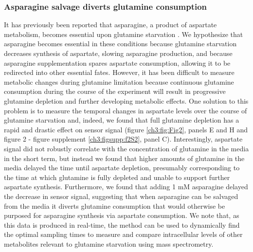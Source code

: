 \subsubsection{Asparagine salvage diverts glutamine consumption}
It has previously been reported that asparagine, a product of aspartate metabolism, becomes essential upon glutamine starvation \cite{Pavlova2018-nl, Zhang2014-zz}.
We hypothesize that asparagine becomes essential in these conditions because glutamine starvation decreases synthesis of aspartate, slowing asparagine production, and because asparagine supplementation spares aspartate consumption, allowing it to be redirected into other essential fates.
However, it has been difficult to measure metabolic changes during glutamine limitation because continuous glutamine consumption during the course of the experiment will result in progressive glutamine depletion and further developing metabolic effects.
One solution to this problem is to measure the temporal changes in aspartate levels over the course of glutamine starvation and, indeed, we found that full glutamine depletion has a rapid and drastic effect on sensor signal (figure \ref{ch3:fig:Fig2}, panels E and H and figure 2 - figure supplement \ref{ch3:figsupp:f2S2}, panel C).
Interestingly, aspartate signal did not robustly correlate with the concentration of glutamine in the media in the short term, but instead we found that higher amounts of glutamine in the media delayed the time until aspartate depletion, presumably corresponding to the time at which glutamine is fully depleted and unable to support further aspartate synthesis.
Furthermore, we found that adding 1 mM asparagine delayed the decrease in sensor signal, suggesting that when asparagine can be salvaged from the media it diverts glutamine consumption that would otherwise be purposed for asparagine synthesis via aspartate consumption.
We note that, as this data is produced in real-time, the method can be used to dynamically find the optimal sampling times to measure and compare intracellular levels of other metabolites relevant to glutamine starvation using mass spectrometry.





